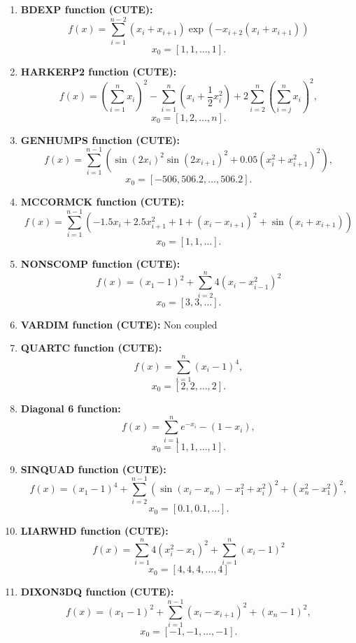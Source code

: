 \documentclass[10pt]{article}
\begin{document}
\begin{enumerate}
    \item \textbf{BDEXP function (CUTE):}
    \[
    f(x) = \sum_{i=1}^{n-2} (x_i + x_{i+1}) \exp(-x_{i+2}(x_i + x_{i+1}))
    \]
    \[
    x_0 = [1, 1, \dots, 1].
    \]

    \item \textbf{HARKERP2 function (CUTE):}
    \[
    f(x) = \left(\sum_{i=1}^{n} x_i \right)^2 - \sum_{i=1}^{n} ( x_i + \frac{1}{2} x_i^2 ) + 2 \sum_{i=2}^{n} \left(\sum_{i=j}^n x_i \right)^2,
    \]
    \[
    x_0 = \left[ 1, 2, ..., n \right].
    \]

    \item \textbf{GENHUMPS function (CUTE):}
    \[
    f(x) = \sum_{i=1}^{n-1} \left( \sin(2x_i)^2 \sin(2x_{i+1})^2 + 0.05 (x_i^2 + x_{i+1}^2)^2 \right),
    \]
    \[
    x_0 = [-506, 506.2, \dots, 506.2].
    \]

    \item \textbf{MCCORMCK function (CUTE):}
    \[
    f(x) = \sum_{i=1}^{n-1} \left(-1.5x_i + 2.5 x_{i+1}^2 + 1 + (x_i - x_{i+1})^2 + \sin(x_i + x_{i+1}) \right)
    \]
    \[
    x_0 = [1, 1, \dots].
    \]

    \item \textbf{NONSCOMP function (CUTE):}
    \[
    f(x) = (x_1 - 1)^2 + \sum_{i=2}^{n} 4 (x_i - x_{i-1}^2)^2 
    \]
    \[
    x_0 = [3, 3, \dots].
    \]

    \item \textbf{VARDIM function (CUTE):}
    Non coupled

    \item \textbf{QUARTC function (CUTE):}
    \[
    f(x) = \sum_{i=1}^{n} (x_i - 1)^4,
    \]
    \[
    x_0 = [2, 2, \dots, 2].
    \]

    \item \textbf{Diagonal 6 function:}
    \[
    f(x) = \sum_{i=1}^{n}  e^{-x_i} - (1 - x_i),
    \]
    \[
    x_0 = [1, 1, \dots, 1].
    \]

    \item \textbf{SINQUAD function (CUTE):}
    \[
    f(x) = (x_1 -1)^4 + \sum_{i=2}^{n-1} \left( \sin(x_i -x_n) - x_1^2  + x_i^2 \right)^2 + (x_n^2 - x_1^2)^2,
    \]
    \[
    x_0 = [0.1, 0.1, \dots].
    \]

    \item \textbf{LIARWHD function (CUTE):}
    \[
    f(x) = \sum_{i=1}^{n} 4\left( x_i^2 - x_1 \right)^2 + \sum_{i=1}^{n} \left( x_i - 1 \right)^2
    \]
    \[
    x_0 = [4, 4, 4, \dots, 4]
    \]

    \item \textbf{DIXON3DQ function (CUTE):}
    \[
    f(x) = (x_1 -1 )^2 + \sum_{i=1}^{n-1} \left( x_i - x_{i+1}\right)^2 + (x_n - 1)^2,
    \]
    \[
    x_0 = [-1, -1, \dots, -1].
    \]


\end{enumerate}
\end{document}
